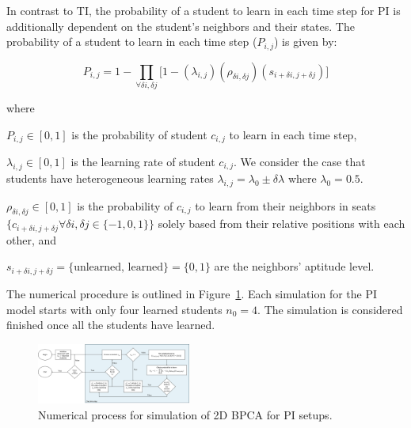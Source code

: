 \documentclass[twocolumn,secnumarabic,amssymb, nobibnotes, aps, prd]{revtex4-2}
\begin{document}
        In contrast to TI, the probability of a student to learn in each time step for PI is additionally dependent on the student's neighbors and their states. The probability of a student to learn in each time step ($P_{i,j}$) is given by:

        \begin{equation}
            \label{eq:BPCA PI learning probability}
                P_{i,j} = 1 - \prod_{\forall \delta i, \delta j}{\lbrack1-(\lambda_{i,j})(\rho_{\delta i, \delta j})(s_{i+\delta i, j+\delta j})}\rbrack
        \end{equation}
        
        where
        
        $P_{i,j} \in [0,1]$ is the probability of student $c_{i,j}$ to learn in each time step, 
        
        $\lambda_{i,j} \in  [0,1]$ is the learning rate of student $c_{i,j}$. We consider the case that students have heterogeneous learning rates $\lambda_{i,j}=\lambda_0 \pm \delta\lambda$ where $\lambda_0=0.5$.
        
        $\rho_{\delta i, \delta j} \in [0,1]$ is the probability of $c_{i,j}$ to learn from their neighbors in seats $\lbrace c_{i+\delta i, j+\delta j} \forall \delta i, \delta j \in \lbrace -1,0,1 \rbrace \rbrace$ solely based from their relative positions with each other, and
        
        $s_{i+\delta i, j+\delta j} = \lbrace\text{unlearned, learned}\rbrace=\lbrace 0,1 \rbrace$ are the neighbors' aptitude level.

        The numerical procedure is outlined in Figure~\ref{fig:PI flowchart}.
        Each simulation for the PI model starts with only four learned students $n_0 = 4$.
        The simulation is considered finished once all the students have learned.

        \begin{figure}[htbp!]
            \centering
            \includegraphics[width=0.45\textwidth]{figures/2DBPCA PI Flowchart.png}
            \caption[Peer instruction simulation flowchart]{Numerical process for simulation of 2D BPCA for PI setups.}
            \label{fig:PI flowchart}
        \end{figure}
\end{document}

